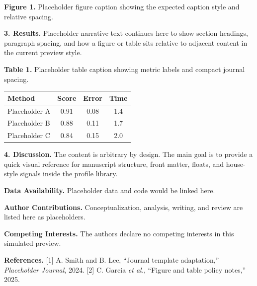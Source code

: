 \documentclass[10pt,a4paper]{article}
\begin{document}
\begin{center}\end{center}\noindent\textbf{Figure 1.} Placeholder figure caption showing the expected caption style and relative spacing.\par\vspace{0.5em}

\textbf{3. Results.} Placeholder narrative text continues here to show section headings, paragraph spacing, and how a figure or table sits relative to adjacent content in the current preview style.

\noindent\textbf{Table 1.} Placeholder table caption showing metric labels and compact journal spacing.\par\begin{center}
\begin{tabular}{lccc}
\toprule
Method & Score & Error & Time\\
\midrule
Placeholder A & 0.91 & 0.08 & 1.4\\
Placeholder B & 0.88 & 0.11 & 1.7\\
Placeholder C & 0.84 & 0.15 & 2.0\\
\bottomrule
\end{tabular}\end{center}\vspace{0.5em}

\textbf{4. Discussion.} The content is arbitrary by design. The main goal is to provide a quick visual reference for manuscript structure, front matter, floats, and house-style signals inside the profile library.


\noindent \textbf{Data Availability.} Placeholder data and code would be linked here.\par
\noindent \textbf{Author Contributions.} Conceptualization, analysis, writing, and review are listed here as placeholders.\par
\noindent \textbf{Competing Interests.} The authors declare no competing interests in this simulated preview.\par
\vspace{0.5em}
\noindent \textbf{References.} [1] A. Smith and B. Lee, ``Journal template adaptation,'' \textit{Placeholder Journal}, 2024. [2] C. Garcia \textit{et al.}, ``Figure and table policy notes,'' 2025.\par
\vspace{0.6em}
\end{document}
